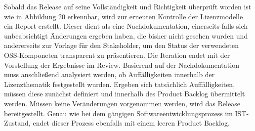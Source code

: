 Sobald das Release auf seine Vollständigkeit und Richtigkeit überprüft worden ist wie in Abbildung 20 erkennbar, wird zur erneuten Kontrolle der Lizenzmodelle ein Report erstellt. Dieser dient als eine Nachdokumentation, einerseits falls sich unbeabsichtigt Änderungen ergeben haben, die bisher nicht gesehen wurden und andererseits zur Vorlage für den Stakeholder, um den Status der verwendeten OSS-Komponeten transparent zu präsentieren. Die Iteration endet mit der Vorstellung der Ergebnisse im Review. Basierend auf der Nachdokumentation muss anschließend analysiert werden, ob Auffälligkeiten innerhalb der Lizenzthematik festgestellt wurden. Ergeben sich tatsächlich Auffälligkeiten, müssen diese zunächst definiert und innerhalb des Product Backlog übermittelt werden. Müssen keine Veränderungen vorgenommen werden, wird das Release bereitgestellt. Genau wie bei dem gängigen Softwareentwicklungsprozess im IST-Zustand, endet dieser Prozess ebenfalls mit einem leeren Product Backlog.  

















